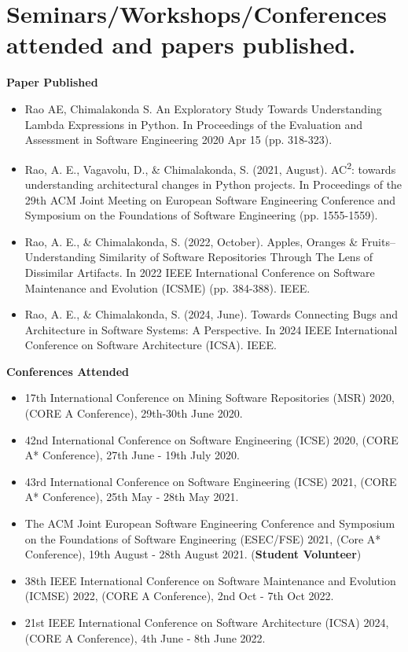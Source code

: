 \documentclass[12pt,table,xcdraw]{article}
\begin{document}
\section{Seminars/Workshops/Conferences attended and papers published.}
\textbf{Paper Published}
\begin{itemize}
    \item Rao AE, Chimalakonda S. An Exploratory Study Towards Understanding Lambda Expressions in Python. In Proceedings of the Evaluation and Assessment in Software Engineering 2020 Apr 15 (pp. 318-323).
    \item Rao, A. E., Vagavolu, D., \& Chimalakonda, S. (2021, August). AC\textsuperscript{2}: towards understanding architectural changes in Python projects. In Proceedings of the 29th ACM Joint Meeting on European Software Engineering Conference and Symposium on the Foundations of Software Engineering (pp. 1555-1559).
    \item Rao, A. E., \& Chimalakonda, S. (2022, October). Apples, Oranges \& Fruits–Understanding Similarity of Software Repositories Through The Lens of Dissimilar Artifacts. In 2022 IEEE International Conference on Software Maintenance and Evolution (ICSME) (pp. 384-388). IEEE.
    \item Rao, A. E., \& Chimalakonda, S. (2024, June). Towards Connecting Bugs and Architecture in Software Systems: A Perspective. In 2024 IEEE International Conference on Software Architecture (ICSA). IEEE.
\end{itemize}

\textbf{Conferences Attended}
\begin{itemize}
    \item 17th International Conference on Mining Software Repositories (MSR) 2020, (CORE A Conference), 29th-30th June 2020.
    \item 42nd International Conference on Software Engineering (ICSE) 2020, (CORE A* Conference), 27th June - 19th July 2020.
    \item 43rd International Conference on Software Engineering (ICSE) 2021, (CORE A* Conference), 25th May - 28th May 2021.
    \item The ACM Joint European Software Engineering Conference and Symposium on the Foundations of Software Engineering (ESEC/FSE) 2021, (Core A* Conference), 19th August - 28th August 2021. (\textbf{Student Volunteer})
    \item 38th IEEE International Conference on Software Maintenance and Evolution (ICMSE) 2022, (CORE A Conference), 2nd Oct - 7th Oct 2022.
    \item 21st IEEE International Conference on Software Architecture (ICSA) 2024, (CORE A Conference), 4th June - 8th June 2022.
\end{itemize}
\end{document}
